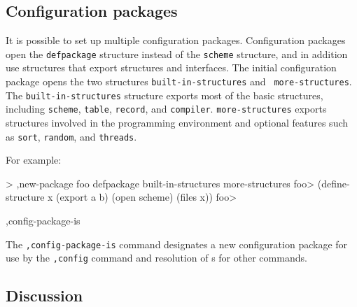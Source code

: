 \subsection*{Configuration packages}

It is possible to set up multiple configuration packages.
Configuration packages open the {\tt defpackage} structure instead of
the {\tt scheme} structure, and in addition use structures that export
structures and interfaces.  The initial configuration package opens
the two structures {\tt built-in-structures} and {\tt
more-structures}.  The {\tt built-in-structures} structure exports
most of the basic structures, including {\tt scheme}, {\tt table},
{\tt record}, and {\tt compiler}.  {\tt more-structures} exports
structures involved in the programming environment and optional
features such as {\tt sort}, {\tt random}, and {\tt threads}.

For example:
\begin{code}
    > ,new-package foo defpackage built-in-structures more-structures
    foo> (define-structure x (export a b)
           (open scheme)
	   (files x))
    foo> 
\end{code}


\begin{list}{}{}{}
\item
\begin{code}
,config-package-is 
\end{code}
    The {\tt,config-package-is} command designates a new configuration
    package for use by the {\tt,config} command and resolution of
    s for other commands.
\end{list}




\subsection*{Discussion}

